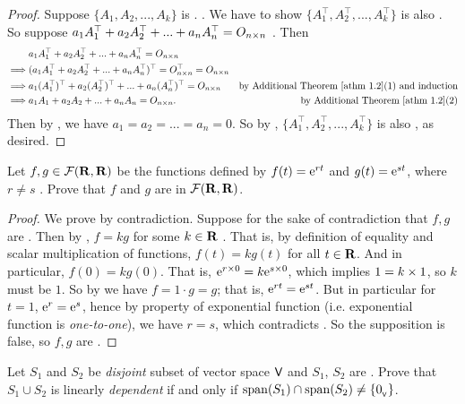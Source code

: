 \begin{proof}
Suppose \(\{ A_1, A_2, ..., A_k \}\) is \LID{}. .
We have to show \(\{ A^\top_1, A^\top_2, ..., A^\top_k \}\) is also \LID{}.
So suppose \(a_1 A^\top_1 + a_2 A^\top_2 + ... + a_n A^\top_n = O_{n \times n}\) .
Then
\begin{align*}
             & a_1 A^\top_1 + a_2 A^\top_2 + ... + a_n A^\top_n = O_{n \X n} \\
    \implies & (a_1 A^\top_1 + a_2 A^\top_2 + ... + a_n A^\top_n)^\top = O_{n \X n}^\top = O_{n \X n} \\
    \implies & a_1 (A^\top_1)^\top + a_2 (A^\top_2)^\top + ... + a_n (A^\top_n)^\top = O_{n \X n} & \text{by \ATHM{1.2}(1) and induction} \\
    \implies & a_1 A_1 + a_2 A_2 + ... + a_n A_n = O_{n \X n}. & \text{by \ATHM{1.2}(2)}
\end{align*}
Then by , we have \(a_1 = a_2 = ... = a_n = 0\).
So by , \(\{ A^\top_1, A^\top_2, ..., A^\top_k \}\) is also \LID{}, as desired.
\end{proof}

\begin{exercise} \label{exercise 1.5.20}
Let \(f, g \in \mathcal{F}(\mathbf{R}, \mathbf{R})\) be the functions defined by \(f(t) = \mathrm{e}^{rt}\) and \(g(t) = \mathrm{e}^{st}\), where \(r \ne s\) .
Prove that \(f\) and \(g\) are \LID{} in \(\mathcal{F}(\mathbf{R}, \mathbf{R})\).
\end{exercise}

\begin{proof}
We prove by contradiction.
Suppose for the sake of contradiction that \(f, g\) are \LDP{} .
Then by , \(f = kg\) for some \(k \in \mathbf{R}\) .
That is, by definition of equality and scalar multiplication of functions, \(f(t) = kg(t)\) for all \(t \in \mathbf{R}\).
And in particular, \(f(0) = kg(0)\).
That is, \(\mathrm{e}^{r \times 0} = k \mathrm{e}^{s \times 0}\), which implies \(1 = k \times 1\), so \(k\) must be \(1\).
So by  we have \(f = 1 \cdot g = g\);
that is, \(\mathrm{e}^{rt} = \mathrm{e}^{st}\).
But in particular for \(t = 1\), \(\mathrm{e}^r = \mathrm{e}^s\), hence by property of exponential function (i.e. exponential function is \emph{one-to-one}), we have \(r = s\), which contradicts .
So the supposition  is false, so \(f, g\) are \LID{}.
\end{proof}

\begin{exercise} \label{exercise 1.5.21}
Let \(S_1\) and \(S_2\) be \emph{disjoint} subset of vector space \(\textsf{V}\) and \(S_1\), \(S_2\) are \LID{}. 
Prove that \(S_1 \cup S_2\) is linearly \emph{dependent} if and only if \(\operatorname{span}(S_1) \cap \operatorname{span}(S_2) \ne \{ 0_{_{\textsf{V}}} \}\).
\end{exercise}

